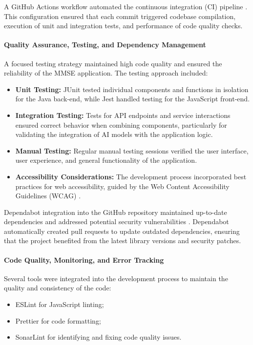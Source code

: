 A GitHub Actions workflow automated the continuous integration (CI) pipeline \cite{github_actions}. This configuration ensured that each commit triggered codebase compilation, execution of unit and integration tests, and performance of code quality checks.

\paragraph{Quality Assurance, Testing, and Dependency Management}
A focused testing strategy maintained high code quality and ensured the reliability of the MMSE application. The testing approach included:
\begin{itemize}
\item \textbf{Unit Testing:} JUnit tested individual components and functions in isolation for the Java back-end, while Jest handled testing for the JavaScript front-end.
\item \textbf{Integration Testing:} Tests for API endpoints and service interactions ensured correct behavior when combining components, particularly for validating the integration of AI models with the application logic.
\item \textbf{Manual Testing:} Regular manual testing sessions verified the user interface, user experience, and general functionality of the application.
\item \textbf{Accessibility Considerations:} The development process incorporated best practices for web accessibility, guided by the Web Content Accessibility Guidelines (WCAG) \cite{wcag}.
\end{itemize}

Dependabot integration into the GitHub repository maintained up-to-date dependencies and addressed potential security vulnerabilities \cite{dependabot}. Dependabot automatically created pull requests to update outdated dependencies, ensuring that the project benefited from the latest library versions and security patches.

\paragraph{Code Quality, Monitoring, and Error Tracking}
Several tools were integrated into the development process to maintain the quality and consistency of the code:
\begin{itemize}
\item ESLint for JavaScript linting;
\item Prettier for code formatting;
\item SonarLint for identifying and fixing code quality issues.
\end{itemize}


